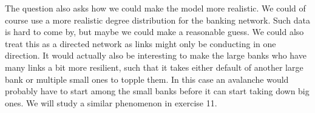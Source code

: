 The question also asks how we could make the model more realistic. We could of course use a more realistic degree distribution for the banking network. Such data is hard to come by, but maybe we could make a reasonable guess. We could also treat this as a directed network as links might only be conducting in one direction. It would actually also be interesting to make the large banks who have many links a bit more resilient, such that it takes either default of another large bank or multiple small ones to topple them. In this case an avalanche would probably have to start among the small banks before it can start taking down big ones. We will study a similar phenomenon in exercise 11.  
